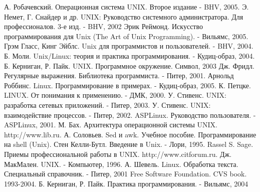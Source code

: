 
\begin{thebibliography}{99}
 А. Робачевский. Операционная система UNIX. Второе издание - BHV, 2005.
 Э. Немет, Г. Снайдер и др. UNIX: Руководство системного администратора. Для профессионалов. 3-е изд. - BHV, 2002
 Эрик Реймонд. Искусство программирования для Unix (The Art of Unix Programming). - Вильямс, 2005.
 Грэм Гласс, Кинг Эйблс. Unix для программистов и пользователей. - BHV, 2004.
 Б. Моли. Unix/Linux: теория и практика программирования. - Кудиц-образ, 2004.
 Б. Керниган, Р. Пайк. UNIX. Программное окружение. Символ, 2003
 Дж. Фридл. Регулярные выражения. Библиотека программиста. - Питер, 2001. 
 Арнольд Роббинс. Linux. Программирование в примерах. - Кудиц-образ, 2005. 
 К. Петцке. LINUX. От понимания к применению. - ДМК, 2000.
 У. Стивенс.  UNIX: разработка сетевых приложений. - Питер, 2003.
 У. Стивенс.  UNIX: взаимодействие процессов. - Питер, 2002.
 ASPLinux. Руководство пользователя. - ASPLinux, 2001.
 М. Бах. Архитектура операционной системы UNIX. http://www.lib.ru.
 А. Соловьев. Sed и awk. Учебное пособие.
 Программирование на  shell (Unix).
 Стен Келли-Бутл. Введение в Unix. - Лори, 1995.
 Rassel S. Sage. Приемы профессиональной работы в UNIX. http://www.citforum.ru.
 Дж. МакМален. UNIX. - Компьютер, 1996.
 А. Шевель. Linux. Обработка текста. Специальный справочник. - Питер, 2001 
 Free Software Foundation. CVS book. 1993-2004.
 Б. Керниган, Р. Пайк. Практика программирования. - Вильямс, 2004

\end{thebibliography}
